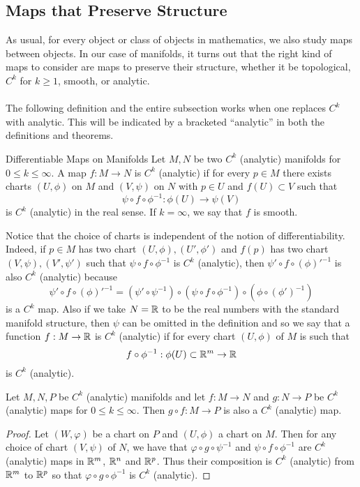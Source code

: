 \documentclass[a4paper]{article}
\begin{document}
\subsection{Maps that Preserve Structure}
As usual, for every object or class of objects in mathematics, we also study maps between objects. In our case of manifolds, it turns out that the right kind of maps to consider are maps to preserve their structure, whether it be topological, $C^k$ for $k\geq 1$, smooth, or analytic. \\~\\

The following definition and the entire subsection works when one replaces $C^k$ with analytic. This will be indicated by a bracketed ``analytic'' in both the definitions and theorems. 

\begin{defn}{Differentiable Maps on Manifolds}{} Let $M,N$ be two $C^k$ (analytic) manifolds for $0\leq k\leq\infty$. A map $f:M\to N$ is $C^k$ (analytic) if for every $p\in M$ there exists charts $(U,\phi)$ on $M$ and $(V,\psi)$ on $N$ with $p\in U$ and $f(U)\subset V$ such that $$\psi\circ f\circ\phi^{-1}:\phi(U)\to\psi(V)$$ is $C^k$ (analytic) in the real sense. If $k=\infty$, we say that $f$ is smooth. 
\end{defn}

Notice that the choice of charts is independent of the notion of differentiability. Indeed, if $p\in M$ has two chart $(U,\phi),(U',\phi')$ and $f(p)$ has two chart $(V,\psi),(V',\psi')$ such that $\psi\circ f\circ\phi^{-1}$ is $C^k$ (analytic), then $\psi'\circ f\circ(\phi)'^{-1}$ is also $C^k$ (analytic) because $$\psi'\circ f\circ(\phi)'^{-1}=\left(\psi'\circ\psi^{-1}\right)\circ\left(\psi\circ f\circ\phi^{-1}\right)\circ\left(\phi\circ(\phi')^{-1}\right)$$ is a $C^k$ map. Also if we take $N=\mathbb{R}$ to be the real numbers with the standard manifold structure, then $\psi$ can be omitted in the definition and so we say that a function $f:M\to\mathbb{R}$ is $C^k$ (analytic) if for every chart $(U,\phi)$ of $M$ is such that $$f\circ\phi^{-1}:\phi(U)\subset\mathbb{R}^m\to\mathbb{R}$$ is $C^k$ (analytic). 

\begin{prp}{}{} Let $M,N,P$ be $C^k$ (analytic) manifolds and let $f:M\to N$ and $g:N\to P$ be $C^k$ (analytic) maps for $0\leq k\leq\infty$. Then $g\circ f:M\to P$ is also a $C^k$ (analytic) map. \tcbline
\begin{proof}
Let $(W,\varphi)$ be a chart on $P$ and $(U,\phi)$ a chart on $M$. Then for any choice of chart $(V,\psi)$ of $N$, we have that $\varphi\circ g\circ\psi^{-1}$ and $\psi\circ f\circ\phi^{-1}$ are $C^k$ (analytic) maps in $\mathbb{R}^m$, $\mathbb{R}^n$ and $\mathbb{R}^p$. Thus their composition is $C^k$ (analytic) from $\mathbb{R}^m$ to $\mathbb{R}^p$ so that $\varphi\circ g\circ\phi^{-1}$ is $C^k$ (analytic). 
\end{proof}
\end{prp}
\end{document}
